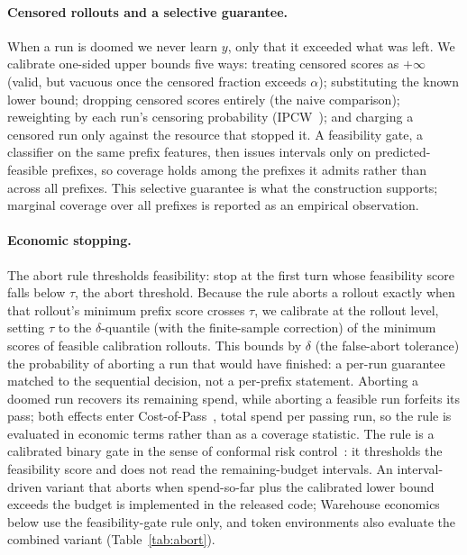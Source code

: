 \documentclass{article}
\begin{document}
\paragraph{Censored rollouts and a selective guarantee.}
When a run is doomed we never learn $y$, only that it exceeded what was left. We calibrate one-sided upper bounds five ways: treating censored scores as $+\infty$ (valid, but vacuous once the censored fraction exceeds $\alpha$); substituting the known lower bound; dropping censored scores entirely (the naive comparison); reweighting by each run's censoring probability (IPCW~\cite{robins1992recovery,gui2024conformalized}); and charging a censored run only against the resource that stopped it. A feasibility gate, a classifier on the same prefix features, then issues intervals only on predicted-feasible prefixes, so coverage holds among the prefixes it admits rather than across all prefixes. This selective guarantee is what the construction supports; marginal coverage over all prefixes is reported as an empirical observation.

\paragraph{Economic stopping.}
The abort rule thresholds feasibility: stop at the first turn whose feasibility score falls below $\tau$, the abort threshold. Because the rule aborts a rollout exactly when that rollout's minimum prefix score crosses $\tau$, we calibrate at the rollout level, setting $\tau$ to the $\delta$-quantile (with the finite-sample correction) of the minimum scores of feasible calibration rollouts. This bounds by $\delta$ (the false-abort tolerance) the probability of aborting a run that would have finished: a per-run guarantee matched to the sequential decision, not a per-prefix statement. Aborting a doomed run recovers its remaining spend, while aborting a feasible run forfeits its pass; both effects enter Cost-of-Pass~\cite{erol2026costofpass}, total spend per passing run, so the rule is evaluated in economic terms rather than as a coverage statistic. The rule is a calibrated binary gate in the sense of conformal risk control~\cite{angelopoulos2024crc}: it thresholds the feasibility score and does not read the remaining-budget intervals. An interval-driven variant that aborts when spend-so-far plus the calibrated lower bound exceeds the budget is implemented in the released code; Warehouse economics below use the feasibility-gate rule only, and token environments also evaluate the combined variant (Table~\ref{tab:abort}).
\end{document}
